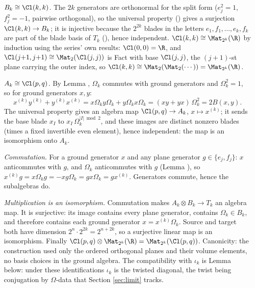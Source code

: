 \emph{$B_k \cong \Cl(k,k)$.} The $2k$ generators are orthonormal for the split form ($e_j^2 = 1$, $f_j^2 = -1$, pairwise orthogonal), so the universal property () gives a surjection $\Cl(k,k) \to B_k$; it is injective because the $2^{2k}$ blades in the letters $e_1, f_1, \dots, e_k, f_k$ are part of the blade basis of $T_k$ (), hence independent. \emph{$\Cl(k,k) \cong \Mat_{2^k}(\R)$} by induction using the series' own results: $\Cl(0,0) = \R$, and $\Cl(j{+}1,j{+}1) \cong \Mat_2(\Cl(j,j))$ is Fact  with base $\Cl(j,j)$, the $(j{+}1)$-st plane carrying the outer index, so $\Cl(k,k) \cong \Mat_2(\Mat_2(\cdots)) = \Mat_{2^k}(\R)$.

\emph{$A_k \cong \Cl(p,q)$.} By Lemma , $\Omega_k$ commutes with ground generators and $\Omega_k^2 = 1$, so for ground generators $x, y$:
\[
x^{(k)} y^{(k)} + y^{(k)} x^{(k)} = x \Omega_k y \Omega_k + y \Omega_k x \Omega_k = (xy + yx)\,\Omega_k^2 = 2B(x,y) .
\]
The universal property gives an algebra map $\Cl(p,q) \to A_k$, $x \mapsto x^{(k)}$; it sends the base blade $x_I$ to $x_I\,\Omega_k^{|I| \bmod 2}$, and these images are distinct nonzero blades (times a fixed invertible even element), hence independent: the map is an isomorphism onto $A_k$.

\emph{Commutation.} For a ground generator $x$ and any plane generator $g \in \{e_j, f_j\}$: $x$ anticommutes with $g$, and $\Omega_k$ anticommutes with $g$ (Lemma ), so $x^{(k)} g = x \Omega_k g = -x g \Omega_k = g x \Omega_k = g x^{(k)}$. Generators commute, hence the subalgebras do.

\emph{Multiplication is an isomorphism.} Commutation makes $A_k \otimes B_k \to T_k$ an algebra map. It is surjective: its image contains every plane generator, contains $\Omega_k \in B_k$, and therefore contains each ground generator $x = x^{(k)} \Omega_k$. Source and target both have dimension $2^n \cdot 2^{2k} = 2^{n + 2k}$, so a surjective linear map is an isomorphism. Finally $\Cl(p,q) \otimes \Mat_{2^k}(\R) = \Mat_{2^k}(\Cl(p,q))$. Canonicity: the construction used only the ordered orthogonal planes and their volume elements, no basis choices in the ground algebra. The compatibility with $\iota_k$ is Lemma  below: under these identifications $\iota_k$ is the twisted diagonal, the twist being conjugation by $\Omega$-data that Section \ref{sec:limit} tracks.
